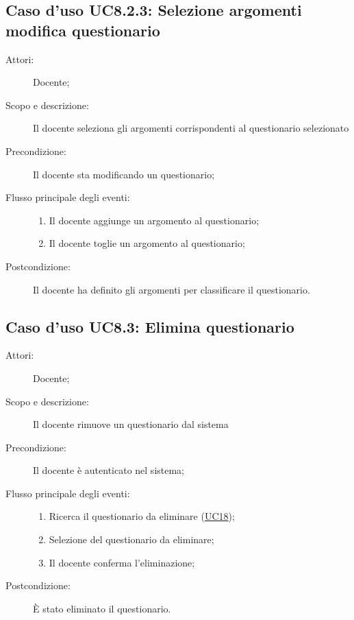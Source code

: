 \subsection{Caso d'uso UC8.2.3: Selezione argomenti modifica questionario}\begin{description}
\item[Attori:] Docente;
\item[Scopo e descrizione:] Il docente seleziona gli argomenti corrispondenti al questionario selezionato
      \item[Precondizione:] Il docente sta modificando un questionario;

        \item[Flusso principale degli eventi:] \begin{enumerate}
          \item Il docente aggiunge un argomento al questionario;
          \item Il docente toglie un argomento al questionario;

      \end{enumerate}
    \item[Postcondizione:] Il docente ha definito gli argomenti per classificare il questionario.
  \end{description}
\hypertarget{UC8.3}{}
\subsection{Caso d'uso UC8.3: Elimina questionario}\begin{description}
\item[Attori:] Docente;
\item[Scopo e descrizione:] Il docente rimuove un questionario dal sistema
      \item[Precondizione:] Il docente è autenticato nel sistema;

        \item[Flusso principale degli eventi:] \begin{enumerate}
          \item Ricerca il questionario da eliminare (\hyperlink{UC18}{UC18});
          \item Selezione del questionario da eliminare;
          \item Il docente conferma l'eliminazione;

      \end{enumerate}
    \item[Postcondizione:] È stato eliminato il questionario.
  \end{description}
\hypertarget{UC8.4}{}

